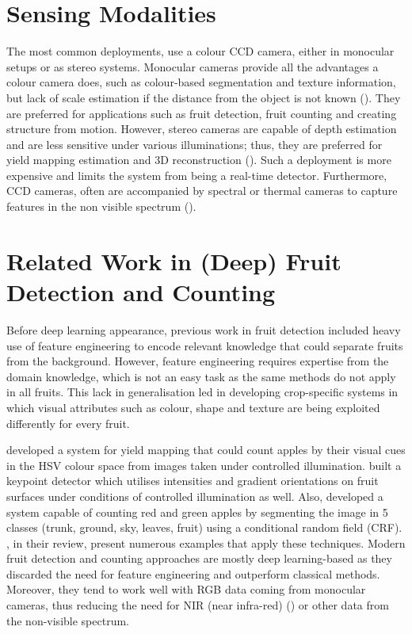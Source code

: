 \section{Sensing Modalities}
The most common deployments, use a colour CCD camera, either in monocular setups or as stereo systems. Monocular cameras provide all the advantages a colour camera does, such as colour-based segmentation and texture information, but lack of scale estimation if the distance from the object is not known (\cite{gongal2015sensors}). They are preferred for applications such as fruit detection, fruit counting and creating structure from motion. However, stereo cameras are capable of depth estimation and are less sensitive under various illuminations; thus, they are preferred for yield mapping estimation and 3D reconstruction (\cite{wang2016localisation}). Such a deployment is more expensive and limits the system from being a real-time detector. Furthermore, CCD cameras, often are accompanied by spectral or thermal cameras to capture features in the non visible spectrum (\cite{gongal2015sensors}).

\section{Related Work in (Deep) Fruit Detection and Counting}
Before deep learning appearance, previous work in fruit detection included heavy use of feature engineering to encode relevant knowledge that could separate fruits from the background. However, feature engineering requires expertise from the domain knowledge, which is not an easy task as the same methods do not apply in all fruits. This lack in generalisation led in developing crop-specific systems in which visual attributes such as colour, shape and texture are being exploited differently for every fruit.

\cite{wang2013automated} developed a system for yield mapping that could count apples by their visual cues in the HSV colour space from images taken under controlled illumination. \cite{pothen2016texture} built a keypoint detector which utilises intensities and gradient orientations on fruit surfaces under conditions of controlled illumination as well. Also, \cite{hung2015feature} developed a system capable of counting red and green apples by segmenting the image in 5 classes (trunk, ground, sky, leaves, fruit) using a conditional random field (CRF). \cite{gongal2015sensors}, in their review, present numerous examples that apply these techniques. Modern fruit detection and counting approaches are mostly deep learning-based as they discarded the need for feature engineering and outperform classical methods. Moreover, they tend to work well with RGB data coming from monocular cameras, thus reducing the need for NIR (near infra-red) (\cite{hung2013orchard}) or other data from the non-visible spectrum.

